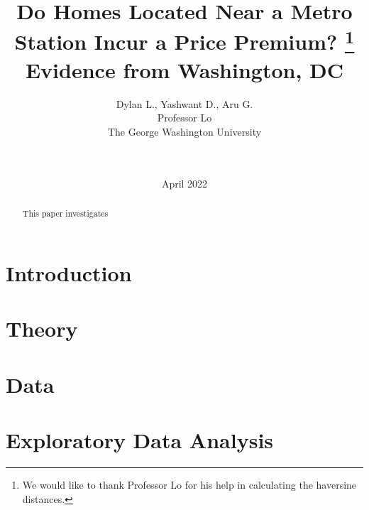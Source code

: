 \documentclass[12pt]{report}
\begin{document}
\title{%
Do Homes Located Near a Metro Station Incur a Price Premium? \thanks{{We would like to thank Professor Lo for his help in calculating the haversine distances.}} \\ 
\Large
Evidence from Washington, DC}
\author{Dylan L., Yashwant D., Aru G. \\ Professor Lo\\The George Washington University\\  \\  \\ }
\date{April 2022}

\maketitle


\bigskip
\bigskip
\bigskip
\bigskip
\bigskip
\bigskip
\bigskip
\bigskip


\begin{abstract}
\smallskip
This paper investigates 

\end{abstract}

\section*{Introduction}
\section*{Theory}
\section*{Data}
\section*{Exploratory Data Analysis}
\end{document}

